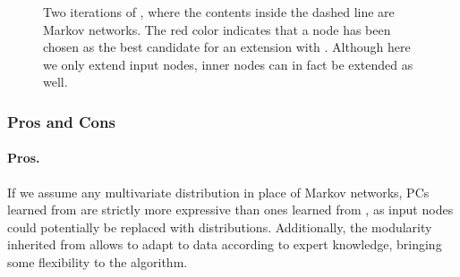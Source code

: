 \begin{figure}[t]
{
  }
  \caption{Two iterations of , where the contents inside the dashed line are
  Markov networks. The red color indicates that a node has been chosen as the best candidate for an
  extension with . Although here we only extend input nodes, inner nodes can in
  fact be extended as well.}
  \label{fig:idspn}
\end{figure}

\subsubsection{Pros and Cons}

\paragraph{Pros.} If we assume any multivariate distribution in place of Markov networks, PCs
learned from  are strictly more expressive than ones learned from
, as input nodes could potentially be replaced with 
distributions. Additionally, the modularity inherited from  allows
 to adapt to data according to expert knowledge, bringing some flexibility to the
algorithm.

